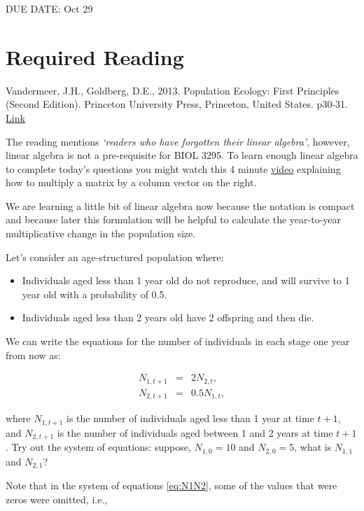 \documentclass[]{book}
\begin{document}
DUE DATE: Oct 29

\section{Required Reading}\label{required-reading}

Vandermeer, J.H., Goldberg, D.E., 2013. Population Ecology: First
Principles (Second Edition). Princeton University Press, Princeton,
United States. p30-31.
\href{https://ebookcentral-proquest-com.qe2a-proxy.mun.ca/lib/mun/detail.action?docID=1205619}{Link}

The reading mentions \emph{`readers who have forgotten their linear
algebra'}, however, linear algebra is not a pre-requisite for BIOL 3295.
To learn enough linear algebra to complete today's questions you might
watch this 4 minute
\href{https://www.youtube.com/watch?v=Awcj447pYuk}{video} explaining how
to multiply a matrix by a column vector on the right.

We are learning a little bit of linear algebra now because the notation
is compact and because later this formulation will be helpful to
calculate the year-to-year multiplicative change in the population size.

Let's consider an age-structured population where:

\begin{itemize}
\item
  Individuals aged less than 1 year old do not reproduce, and will
  survive to 1 year old with a probability of 0.5.
\item
  Individuals aged less than 2 years old have 2 offspring and then die.
\end{itemize}

We can write the equations for the number of individuals in each stage
one year from now as:

\begin{eqnarray}
N_{1,t+1} & = & 2 N_{2,t}, \nonumber \\
N_{2,t+1} & = & 0.5 N_{1,t}, 
 \label{eq:N1N2}
\end{eqnarray}

where \(N_{1,t+1}\) is the number of individuals aged less than 1 year
at time \(t+1\), and \(N_{2,t+1}\) is the number of individuals aged
between 1 and 2 years at time \(t+1\). Try out the system of equations:
suppose, \(N_{1,0} = 10\) and \(N_{2,0} = 5\), what is \(N_{1,1}\) and
\(N_{2,1}\)?

Note that in the system of equations \eqref{eq:N1N2}, some of the values
that were zeros were omitted, i.e.,
\end{document}
